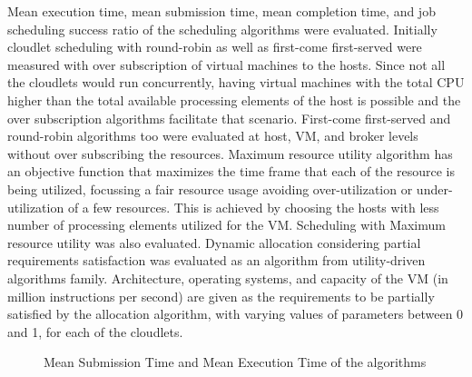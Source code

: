 \documentclass[times, 10pt,twocolumn]{article}
\begin{document}
Mean execution time, mean submission time, mean completion time, and job scheduling success ratio of the scheduling algorithms were evaluated. Initially cloudlet scheduling with round-robin as well as first-come first-served were measured with over subscription of virtual machines to the hosts. Since not all the cloudlets would run concurrently, having virtual machines with the total CPU higher than the total available processing elements of the host is possible and the over subscription algorithms facilitate that scenario. First-come first-served and round-robin algorithms too were evaluated at host, VM, and broker levels without over subscribing the resources. Maximum resource utility algorithm has an objective function that maximizes the time frame that each of the resource is being utilized, focussing a fair resource usage avoiding over-utilization or under-utilization of a few resources. This is achieved by choosing the hosts with less number of processing elements utilized for the VM. Scheduling with Maximum resource utility was also evaluated. Dynamic allocation considering partial requirements satisfaction was evaluated as an algorithm from utility-driven algorithms family. Architecture, operating systems, and capacity of the VM (in million instructions per second) are given as the requirements to be partially satisfied by the allocation algorithm, with varying values of parameters between 0 and 1, for each of the cloudlets.

\begin{figure}[ht]
 \caption{Mean Submission Time and Mean Execution Time of the algorithms}
 \label{fig:met}
\end{figure}
\end{document}
